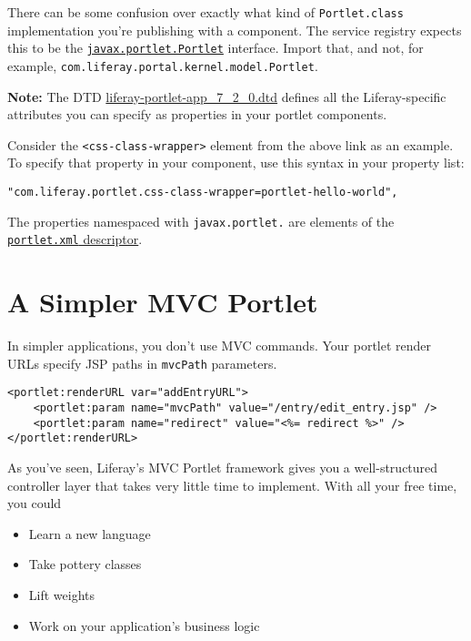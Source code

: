 \noindent\hrulefill

There can be some confusion over exactly what kind of
\texttt{Portlet.class} implementation you're publishing with a
component. The service registry expects this to be the
\href{https://docs.liferay.com/portlet-api/3.0/javadocs/javax/portlet/Portlet.html}{\texttt{javax.portlet.Portlet}}
interface. Import that, and not, for example,
\texttt{com.liferay.portal.kernel.model.Portlet}.

\noindent\hrulefill

\textbf{Note:} The DTD
\href{https://docs.liferay.com/dxp/portal/7.2-latest/definitions/liferay-portlet-app_7_2_0.dtd.html}{liferay-portlet-app\_7\_2\_0.dtd}
defines all the Liferay-specific attributes you can specify as
properties in your portlet components.

Consider the \texttt{\textless{}css-class-wrapper\textgreater{}} element
from the above link as an example. To specify that property in your
component, use this syntax in your property list:

\texttt{"com.liferay.portlet.css-class-wrapper=portlet-hello-world",}

The properties namespaced with \texttt{javax.portlet.} are elements of
the
\href{https://docs.liferay.com/portlet-api/3.0/portlet-app_3_0.xsd}{\texttt{portlet.xml}
descriptor}.

\noindent\hrulefill

\section{A Simpler MVC Portlet}\label{a-simpler-mvc-portlet}

In simpler applications, you don't use MVC commands. Your portlet render
URLs specify JSP paths in \texttt{mvcPath} parameters.

\begin{verbatim}
<portlet:renderURL var="addEntryURL">
    <portlet:param name="mvcPath" value="/entry/edit_entry.jsp" />
    <portlet:param name="redirect" value="<%= redirect %>" />
</portlet:renderURL>
\end{verbatim}

As you've seen, Liferay's MVC Portlet framework gives you a
well-structured controller layer that takes very little time to
implement. With all your free time, you could

\begin{itemize}
\tightlist
\item
  Learn a new language
\item
  Take pottery classes
\item
  Lift weights
\item
  Work on your application's business logic
\end{itemize}

